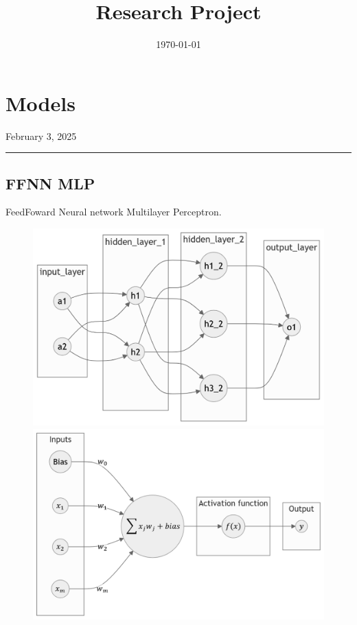 \documentclass[letterpaper,11pt]{article}
\title{\textbf{Research Project}}
\author{}
\date{\today}
\begin{document}

\newpage
\section*{Models}
\begin{flushright}
February 3, 2025
\end{flushright}
\hrule
\vspace{0.2in}

\begin{center}
    \subsection*{FFNN MLP}
    FeedFoward Neural network Multilayer Perceptron.
\end{center}
  
\begin{figure}[H]
    \centering
    \begin{minipage}[b]{0.45\textwidth}
      \centering
      \includegraphics[width=\linewidth]{img/ffnn_exemple.png} 
    \end{minipage}
    \hfill
    \begin{minipage}[b]{0.45\textwidth}
      \centering
      \includegraphics[width=\linewidth]{img/perceptron.png}
    \end{minipage}
  \end{figure}
\end{document}
